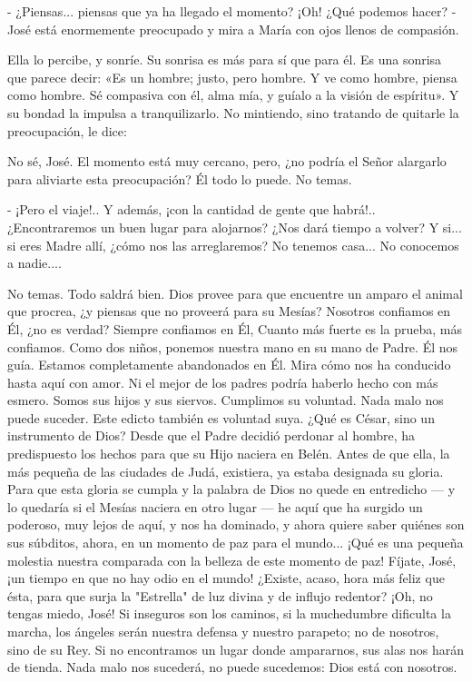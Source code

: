 \documentclass[12pt, twoside, openright]{book} %
\begin{document}
- ¿Piensas... piensas que ya ha llegado el momento? ¡Oh! ¿Qué podemos hacer? - José está enormemente preocupado y mira a María con ojos llenos de compasión. 

Ella lo percibe, y sonríe. Su sonrisa es más para sí que para él. Es una sonrisa que parece decir: «Es un hombre; justo, pero hombre. Y ve como hombre, piensa como hombre. Sé compasiva con él, alma mía, y guíalo a la visión de espíritu». Y su bondad la impulsa a tranquilizarlo. No mintiendo, sino tratando de quitarle la preocupación, le dice: 

No sé, José. El momento está muy cercano, pero, ¿no podría el Señor alargarlo para aliviarte esta preocupación? Él todo lo puede. No temas. 

- ¡Pero el viaje!.. Y además, ¡con la cantidad de gente que habrá!.. ¿Encontraremos un buen lugar para alojarnos? ¿Nos dará tiempo a volver? Y si... si eres Madre allí, ¿cómo nos las arreglaremos? No tenemos casa... No conocemos a nadie.... 

No temas. Todo saldrá bien. Dios provee para que encuentre un amparo el animal que procrea, ¿y piensas que no proveerá para su Mesías? Nosotros confiamos en Él, ¿no es verdad? Siempre confiamos en Él, Cuanto más fuerte es la prueba, más confiamos. Como dos niños, ponemos nuestra mano en su mano de Padre. Él nos guía. Estamos completamente abandonados en Él. Mira cómo nos ha conducido hasta aquí con amor. Ni el mejor de los padres podría haberlo hecho con más esmero. Somos sus hijos y sus siervos. Cumplimos su voluntad. Nada malo nos puede suceder. Este edicto también es voluntad suya. ¿Qué es César, sino un instrumento de Dios? Desde que el Padre decidió perdonar al hombre, ha predispuesto los hechos para que su Hijo naciera en Belén. Antes de que ella, la más pequeña de las ciudades de Judá, existiera, ya estaba designada su gloria. Para que esta gloria se cumpla y la palabra de Dios no quede en entredicho — y lo quedaría si el Mesías naciera en otro lugar — he aquí que ha surgido un poderoso, muy lejos de aquí, y nos ha dominado, y ahora quiere saber quiénes son sus súbditos, ahora, en un momento de paz para el mundo... ¡Qué es una pequeña molestia nuestra comparada con la belleza de este momento de paz! Fíjate, José, ¡un tiempo en que no hay odio en el mundo! ¿Existe, acaso, hora más feliz que ésta, para que surja la "Estrella" de luz divina y de influjo redentor? ¡Oh, no tengas miedo, José! Si inseguros son los caminos, si la muchedumbre dificulta la marcha, los ángeles serán nuestra defensa y nuestro parapeto; no de nosotros, sino de su Rey. Si no encontramos un lugar donde ampararnos, sus alas nos harán de tienda. Nada malo nos sucederá, no puede sucedemos: Dios está con nosotros. 
\end{document}
